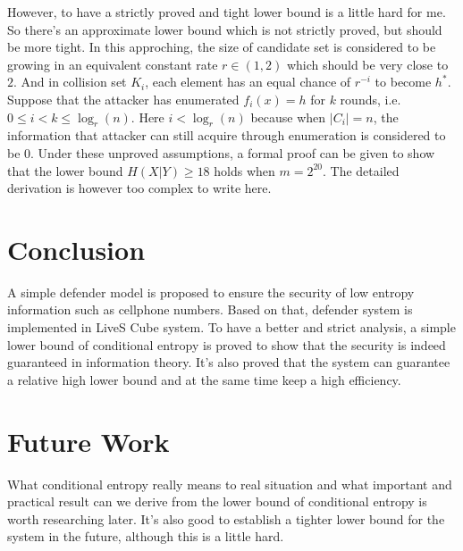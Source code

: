 \documentclass[10pt,a4paper]{article}
\begin{document}
		However, to have a strictly proved and tight lower bound
		is a little hard for me.
		So there's an approximate lower bound which is not
		strictly proved, but should be more tight.
		In this approching,
		the size of candidate set is
		considered to be growing in an equivalent
		constant rate $r \in (1, 2)$ which
		should be very close to $2$.
		And in collision set $K_i$, each
		element has an equal chance of
		$r^{-i}$ to become $h^*$.
		Suppose that the attacker
		has enumerated $f_i(x) = h$
		for $k$ rounds, i.e. $0 \leq i < k \leq \log_r(n)$. Here
		$i < \log_r(n)$ because when
		$|C_i| = n$, the information that
		attacker can still acquire through
		enumeration is considered to be $0$.
		Under these unproved assumptions,
		a formal proof can be given to show that the lower bound
		$H(X | Y) \geq 18$ holds when $m = 2^{20}$. 
		The detailed derivation is however too complex
		to write here.
		
\section{Conclusion}
	A simple defender model is proposed to ensure
	the security of low entropy information
	such as cellphone numbers. Based on that, defender system
	 is implemented in LiveS Cube
	system. To have a better and strict analysis, a simple lower bound of conditional
	entropy is proved to show that the security
	is indeed guaranteed in information theory.
	It's also proved that the system can guarantee
	a relative high lower bound and at the same time
	keep a high efficiency.
	
\section{Future Work}
	What conditional entropy really means to
	real situation and what important and practical
	result can we derive from the lower bound of
	conditional entropy is worth researching later.
	It's also good to establish a tighter lower bound
	for the system in the future, although this is
	a little hard.
		
\end{document}

